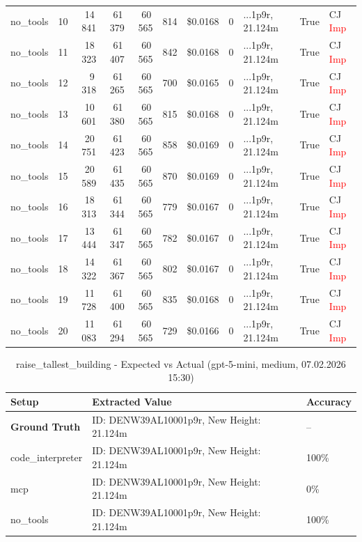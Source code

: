 \documentclass[a4paper,11pt]{article}
\begin{document}
\begin{table}[H]
{\begin{tabular}{l r r r r r r r l r l}
no\_tools & 10 & 14\,841 & 61\,379 & 60\,565 & 814 & \$0.0168 & 0 & ...1p9r, 21.124m & True & CJ \textcolor{red}{Imp} \\
no\_tools & 11 & 18\,323 & 61\,407 & 60\,565 & 842 & \$0.0168 & 0 & ...1p9r, 21.124m & True & CJ \textcolor{red}{Imp} \\
no\_tools & 12 & 9\,318 & 61\,265 & 60\,565 & 700 & \$0.0165 & 0 & ...1p9r, 21.124m & True & CJ \textcolor{red}{Imp} \\
no\_tools & 13 & 10\,601 & 61\,380 & 60\,565 & 815 & \$0.0168 & 0 & ...1p9r, 21.124m & True & CJ \textcolor{red}{Imp} \\
no\_tools & 14 & 20\,751 & 61\,423 & 60\,565 & 858 & \$0.0169 & 0 & ...1p9r, 21.124m & True & CJ \textcolor{red}{Imp} \\
no\_tools & 15 & 20\,589 & 61\,435 & 60\,565 & 870 & \$0.0169 & 0 & ...1p9r, 21.124m & True & CJ \textcolor{red}{Imp} \\
no\_tools & 16 & 18\,313 & 61\,344 & 60\,565 & 779 & \$0.0167 & 0 & ...1p9r, 21.124m & True & CJ \textcolor{red}{Imp} \\
no\_tools & 17 & 13\,444 & 61\,347 & 60\,565 & 782 & \$0.0167 & 0 & ...1p9r, 21.124m & True & CJ \textcolor{red}{Imp} \\
no\_tools & 18 & 14\,322 & 61\,367 & 60\,565 & 802 & \$0.0167 & 0 & ...1p9r, 21.124m & True & CJ \textcolor{red}{Imp} \\
no\_tools & 19 & 11\,728 & 61\,400 & 60\,565 & 835 & \$0.0168 & 0 & ...1p9r, 21.124m & True & CJ \textcolor{red}{Imp} \\
no\_tools & 20 & 11\,083 & 61\,294 & 60\,565 & 729 & \$0.0166 & 0 & ...1p9r, 21.124m & True & CJ \textcolor{red}{Imp} \\
\bottomrule
\end{tabular}}
\end{table}

\begin{table}[H]
\centering
\scriptsize
\caption{raise\_tallest\_building - Expected vs Actual (gpt-5-mini, medium, 07.02.2026 15:30)}
\begin{tabular}{l l l}
\toprule
Setup & Extracted Value & Accuracy \\
\midrule
\textbf{Ground Truth} & ID: DENW39AL10001p9r, New Height: 21.124m & -- \\
\midrule
code\_interpreter & ID: DENW39AL10001p9r, New Height: 21.124m & 100\% \\
mcp & ID: DENW39AL10001p9r, New Height: 21.124m & 0\% \\
no\_tools & ID: DENW39AL10001p9r, New Height: 21.124m & 100\% \\
\bottomrule
\end{tabular}
\end{table}
\end{document}

